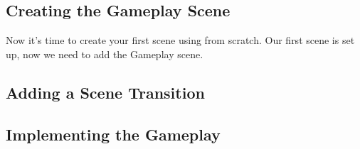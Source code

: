 \subsection{Creating the Gameplay Scene}
Now it's time to create your first scene using \SB{} from scratch. Our first
scene is set up, now we need to add the Gameplay scene. 
\subsection{Adding a Scene Transition}
\subsection{Implementing the Gameplay}
